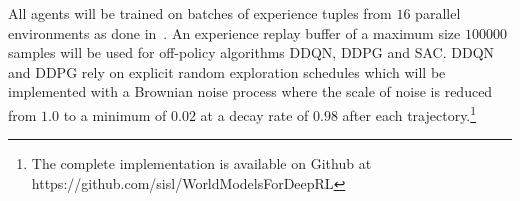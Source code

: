 All agents will be trained on batches of experience tuples from $16$ parallel environments as done in~\cite{mnih2016asynchronous}. An experience replay buffer of a maximum size $100000$ samples will be used for off-policy algorithms DDQN, DDPG and SAC. DDQN and DDPG rely on explicit random exploration schedules which will be implemented with a Brownian noise process where the scale of noise is reduced from $1.0$ to a minimum of $0.02$ at a decay rate of $0.98$ after each trajectory.\footnote{The complete implementation is available on Github at https://github.com/sisl/WorldModelsForDeepRL} %